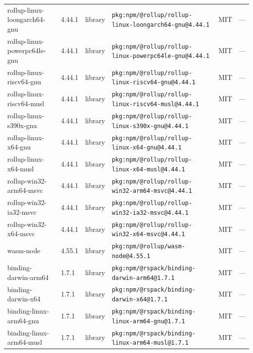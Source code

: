 \documentclass[11pt,a4paper]{article}
\begin{document}
\begin{longtable}{|p{4cm}|p{2cm}|p{1.6cm}|p{5cm}|p{1.5cm}|p{3.5cm}|}
\raggedright rollup-linux-loongarch64-gnu & 4.44.1 & library & \small\texttt{pkg:npm/@rollup/rollup-linux-loongarch64-gnu@4.44.1} & MIT & \small — \\
\raggedright rollup-linux-powerpc64le-gnu & 4.44.1 & library & \small\texttt{pkg:npm/@rollup/rollup-linux-powerpc64le-gnu@4.44.1} & MIT & \small — \\
\raggedright rollup-linux-riscv64-gnu & 4.44.1 & library & \small\texttt{pkg:npm/@rollup/rollup-linux-riscv64-gnu@4.44.1} & MIT & \small — \\
\raggedright rollup-linux-riscv64-musl & 4.44.1 & library & \small\texttt{pkg:npm/@rollup/rollup-linux-riscv64-musl@4.44.1} & MIT & \small — \\
\raggedright rollup-linux-s390x-gnu & 4.44.1 & library & \small\texttt{pkg:npm/@rollup/rollup-linux-s390x-gnu@4.44.1} & MIT & \small — \\
\raggedright rollup-linux-x64-gnu & 4.44.1 & library & \small\texttt{pkg:npm/@rollup/rollup-linux-x64-gnu@4.44.1} & MIT & \small — \\
\raggedright rollup-linux-x64-musl & 4.44.1 & library & \small\texttt{pkg:npm/@rollup/rollup-linux-x64-musl@4.44.1} & MIT & \small — \\
\raggedright rollup-win32-arm64-msvc & 4.44.1 & library & \small\texttt{pkg:npm/@rollup/rollup-win32-arm64-msvc@4.44.1} & MIT & \small — \\
\raggedright rollup-win32-ia32-msvc & 4.44.1 & library & \small\texttt{pkg:npm/@rollup/rollup-win32-ia32-msvc@4.44.1} & MIT & \small — \\
\raggedright rollup-win32-x64-msvc & 4.44.1 & library & \small\texttt{pkg:npm/@rollup/rollup-win32-x64-msvc@4.44.1} & MIT & \small — \\
\raggedright wasm-node & 4.55.1 & library & \small\texttt{pkg:npm/@rollup/wasm-node@4.55.1} & MIT & \small — \\
\raggedright binding-darwin-arm64 & 1.7.1 & library & \small\texttt{pkg:npm/@rspack/binding-darwin-arm64@1.7.1} & MIT & \small — \\
\raggedright binding-darwin-x64 & 1.7.1 & library & \small\texttt{pkg:npm/@rspack/binding-darwin-x64@1.7.1} & MIT & \small — \\
\raggedright binding-linux-arm64-gnu & 1.7.1 & library & \small\texttt{pkg:npm/@rspack/binding-linux-arm64-gnu@1.7.1} & MIT & \small — \\
\raggedright binding-linux-arm64-musl & 1.7.1 & library & \small\texttt{pkg:npm/@rspack/binding-linux-arm64-musl@1.7.1} & MIT & \small — \\

\end{longtable}
\end{document}
